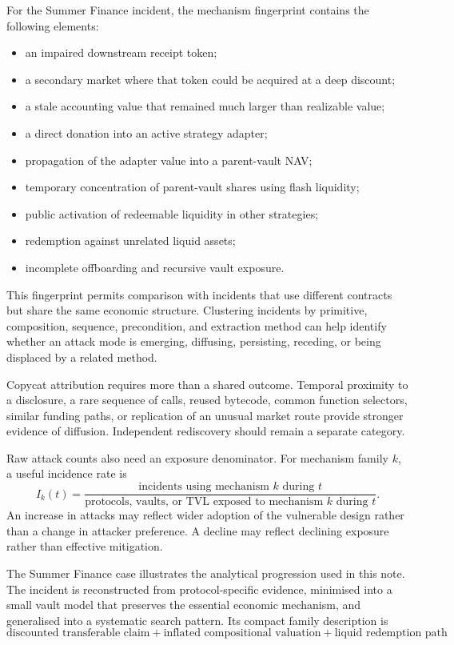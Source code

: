 \documentclass[11pt]{article}
\begin{document}
For the Summer Finance incident, the mechanism fingerprint contains the following elements:
\begin{itemize}[nosep]
    \item an impaired downstream receipt token;
    \item a secondary market where that token could be acquired at a deep discount;
    \item a stale accounting value that remained much larger than realizable value;
    \item a direct donation into an active strategy adapter;
    \item propagation of the adapter value into a parent-vault NAV;
    \item temporary concentration of parent-vault shares using flash liquidity;
    \item public activation of redeemable liquidity in other strategies;
    \item redemption against unrelated liquid assets;
    \item incomplete offboarding and recursive vault exposure.
\end{itemize}

This fingerprint permits comparison with incidents that use different contracts but share the same economic structure.  Clustering incidents by primitive, composition, sequence, precondition, and extraction method can help identify whether an attack mode is emerging, diffusing, persisting, receding, or being displaced by a related method.

Copycat attribution requires more than a shared outcome.  Temporal proximity to a disclosure, a rare sequence of calls, reused bytecode, common function selectors, similar funding paths, or replication of an unusual market route provide stronger evidence of diffusion.  Independent rediscovery should remain a separate category.

Raw attack counts also need an exposure denominator.  For mechanism family $k$, a useful incidence rate is
\begin{equation}
    I_k(t)
    =
    \frac{\text{incidents using mechanism }k\text{ during }t}
         {\text{protocols, vaults, or TVL exposed to mechanism }k\text{ during }t}.
\end{equation}
An increase in attacks may reflect wider adoption of the vulnerable design rather than a change in attacker preference.  A decline may reflect declining exposure rather than effective mitigation.

The Summer Finance case illustrates the analytical progression used in this note.  The incident is reconstructed from protocol-specific evidence, minimised into a small vault model that preserves the essential economic mechanism, and generalised into a systematic search pattern.  Its compact family description is
\begin{equation}
    \boxed{
    \text{discounted transferable claim}
    + \text{inflated compositional valuation}
    + \text{liquid redemption path}
    }.
\end{equation}
\end{document}
